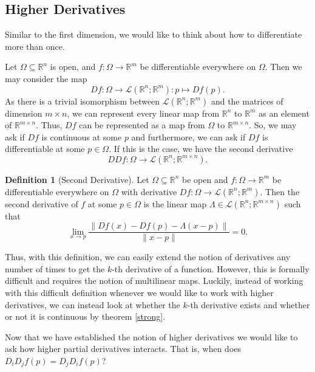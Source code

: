 \documentclass[
]{article}
\theoremstyle{definition}
\newtheorem{definition}{Definition}[section]
\begin{document}
\hypertarget{higher-derivatives}{%
\subsection{Higher Derivatives}\label{higher-derivatives}}

Similar to the first dimension, we would like to think about how to
differentiate more than once.

Let \(\Omega \subseteq \mathbb{R}^n\) is open, and
\(f : \Omega \to \mathbb{R}^m\) be differentiable everywhere on
\(\Omega\). Then we may consider the map
\[Df : \Omega \to \mathcal{L}(\mathbb{R}^n; \mathbb{R}^m) : p \mapsto Df(p).\]
As there is a trivial isomorphism between
\(\mathcal{L}(\mathbb{R}^n; \mathbb{R}^m)\) and the matrices of
dimension \(m \times n\), we can represent every linear map from
\(\mathbb{R}^n\) to \(\mathbb{R}^m\) as an element of
\(\mathbb{R}^{m \times n}\). Thus, \(Df\) can be represented as a map
from \(\Omega\) to \(\mathbb{R}^{m \times n}\). So, we may ask if \(Df\)
is continuous at some \(p\) and furthermore, we can ask if \(Df\) is
differentiable at some \(p \in \Omega\). If this is the case, we have
the second derivative
\[DDf : \Omega \to \mathcal{L}(\mathbb{R}^n; \mathbb{R}^{m \times n}).\]

\begin{definition}[Second Derivative]
  Let \(\Omega \subseteq \mathbb{R}^n\) be open and \(f : \Omega \to \mathbb{R}^m\) 
  be differentiable everywhere on \(\Omega\) with derivative 
  \(Df : \Omega \to \mathcal{L}(\mathbb{R}^n; \mathbb{R}^m)\). Then the second 
  derivative of \(f\) at some \(p \in \Omega\) is the linear map 
  \(\Lambda \in \mathcal{L}(\mathbb{R}^n; \mathbb{R}^{m \times n})\) such that 
  \[\lim_{x \to p} \frac{\| Df(x) - Df(p) - \Lambda(x - p) \|}{\| x - p\|} = 0.\]
\end{definition}

Thus, with this definition, we can easily extend the notion of
derivatives any number of times to get the \(k\)-th derivative of a
function. However, this is formally difficult and requires the notion of
multilinear maps. Luckily, instead of working with this difficult
definition whenever we would like to work with higher derivatives, we
can instead look at whether the \(k\)-th derivative exists and whether
or not it is continuous by theorem \ref{strong}.

Now that we have established the notion of higher derivatives we would
like to ask how higher partial derivatives interacts. That is, when does
\(D_i D_j f(p) = D_j D_i f(p)\)?
\end{document}
